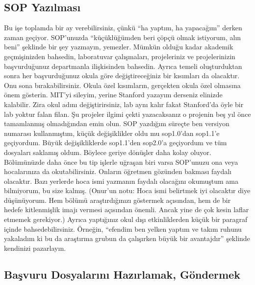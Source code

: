 \documentclass[12pt]{article}
\begin{document}
\subsection{SOP Yazılması}
Bu işe toplamda bir ay verebilirsiniz, çünkü “ha yaptım, ha yapacağım” derken zaman geçiyor. SOP’unuzda “küçüklüğümden beri çöpçü olmak istiyorum, alın beni” şeklinde bir şey yazmayın, yemezler. Mümkün olduğu kadar akademik geçmişinizden bahsedin, laboratuvar çalışmaları, projeleriniz ve projelerinizin başvurduğunuz departmanla ilişkisinden bahsedin. Ayrıca temeli oluşturduktan sonra her başvurduğunuz okula göre değiştireceğiniz bir kısımları da olacaktır. Onu sona bırakabilirsiniz. Okula özel kısımların, gerçekten okula özel olmasına önem gösterin. MIT’yi sileyim, yerine Stanford yazayım derseniz elinizde kalabilir. Zira okul adını değiştirirsiniz, lab aynı kalır fakat Stanford’da öyle bir lab yoktur falan filan. Şu projeler ilgimi çekti yazacaksanız o projenin beş yıl önce tamamlanmış olmadığından emin olun. SOP yazdığım süreçte ben versiyon numarası kullanmıştım, küçük değişiklikler oldu mu sop1.0’dan sop1.1’e geçiyordum. Büyük değişikliklerde sop1.1’den sop2.0’a geçiyordum ve tüm dosyaları saklamış oldum. Böylece geriye dönüşler daha kolay oluyor. Bölümünüzde daha önce bu tip işlerle uğraşan biri varsa SOP’unuzu ona veya hocalarınıza da okutabilirsiniz. Onların öğretmen gözünden bakması faydalı olacaktır. Bazı yerlerde hoca ismi yazmanın faydalı olacağını okumuştum ama bilmiyorum, bu size kalmış. (Onur’un notu: Hoca ismi belirtmek iyi olacaktır diye düşünüyorum. Hem bölümü araştırdığınızı göstermek açısından, hem de bir hedefe kitlenmişlik imajı vermesi açısından önemli. Ancak yine de çok kesin laflar etmemek gerekiyor.) Ayrıca yaptığınız okul dışı etkinliklerden küçük bir paragraf içinde bahsedebilirsiniz. Örneğin, “efendim ben yelken yaptım ve takım ruhunu yakaladım ki bu da araştırma grubun da çalışırken büyük bir avantajdır” şeklinde kendinizi pazarlayın.

\subsection{Başvuru Dosyalarını Hazırlamak, Göndermek}
\end{document}
